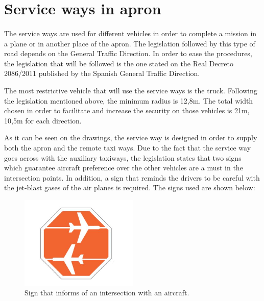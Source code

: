 	\section{Service ways in apron}
	\paragraph{} The service ways are used for different vehicles in order to complete a mission in a plane or in another place of the apron. The legislation followed by this type of road depends on the General Traffic Direction. In order to ease the procedures, the legislation that will be followed is the one stated on the Real Decreto 2086/2011 published by the Spanish General Traffic Direction. 
	
	The most restrictive vehicle that will use the service ways is the truck. Following the legislation mentioned above, the minimum radius is 12,8m. The total width chosen in order to facilitate and increase the security on those vehicles is 21m, 10,5m for each direction.
	
	As it can be seen on the drawings, the service way is designed in order to supply both the apron and the remote taxi ways. Due to the fact that the service way goes across with the auxiliary taxiways, the legislation states that two signs which guarantee aircraft preference over the other vehicles are a must in the intersection points. In addition, a sign that reminds the drivers to be careful with the jet-blast gases of the air planes is required. The signs used are shown below:
	
	\begin{figure}[H]
		\centering
		\includegraphics[clip, trim=0cm 0cm 0cm 0cm, width=0.5\textwidth]{./images/serviceway/sign1}
		\caption{Sign that informs of an intersection with an aircraft.} %
		\label{} %
	\end{figure} 
 	
